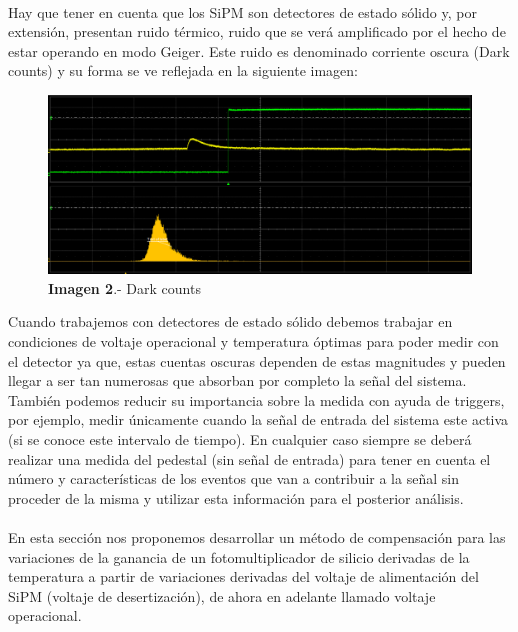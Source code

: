 \documentclass[11pt, a4paper]{article}
\begin{document}
\paragraph {}
Hay que tener en cuenta que los SiPM son detectores de estado sólido y, por extensión, presentan ruido térmico, ruido que se verá amplificado por el hecho de estar operando en modo Geiger. Este ruido es denominado corriente oscura (Dark counts) y su forma se ve reflejada en la siguiente imagen:

\begin{figure}[hbtp]
\centering
\includegraphics[scale=0.2]{pedestal.png}
\caption{\textbf{Imagen 2}.- Dark counts}
\end{figure}


Cuando trabajemos con detectores de estado sólido debemos trabajar en condiciones de voltaje operacional y temperatura óptimas para poder medir con el detector ya  que, estas cuentas oscuras dependen de estas magnitudes y pueden llegar a ser tan numerosas que absorban por completo la señal del sistema. También podemos reducir su importancia sobre la medida con ayuda de triggers, por ejemplo, medir únicamente cuando la señal de entrada del sistema este activa (si se conoce este intervalo de tiempo). En cualquier caso siempre se deberá realizar una medida del pedestal (sin señal de entrada) para tener en cuenta el número y características de los eventos que van a contribuir a la señal sin proceder de la misma y utilizar esta información para el posterior análisis. 

\paragraph {}
En esta sección nos proponemos desarrollar un método de compensación para las variaciones de la ganancia de un fotomultiplicador de silicio derivadas de la temperatura a partir de variaciones derivadas del voltaje de alimentación del SiPM (voltaje de desertización), de ahora en adelante llamado voltaje operacional. 
\end{document}
